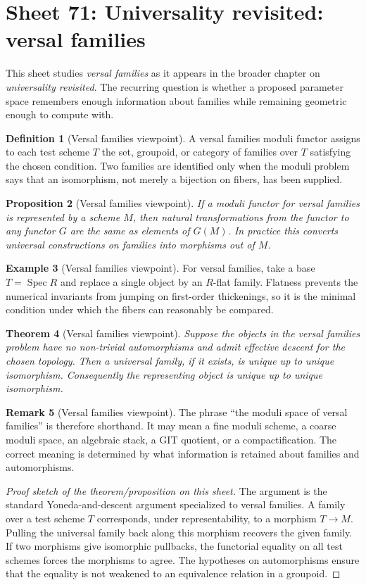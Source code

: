 \documentclass[11pt]{amsart}
\newtheorem{theorem}{Theorem}[section]
\newtheorem{proposition}[theorem]{Proposition}
\theoremstyle{definition}
\newtheorem{definition}[theorem]{Definition}
\newtheorem{example}[theorem]{Example}
\newtheorem{remark}[theorem]{Remark}
\newcommand{\Spec}{\operatorname{Spec}}
\begin{document}
\section{Sheet 71: Universality revisited: versal families}
This sheet studies \emph{versal families} as it appears in the broader chapter on \emph{universality revisited}.  The recurring question is whether a proposed parameter space remembers enough information about families while remaining geometric enough to compute with.
\begin{definition}[Versal families viewpoint]
A versal families moduli functor assigns to each test scheme $T$ the set, groupoid, or category of families over $T$ satisfying the chosen condition.  Two families are identified only when the moduli problem says that an isomorphism, not merely a bijection on fibers, has been supplied.
\end{definition}
\begin{proposition}[Versal families viewpoint]
If a moduli functor for versal families is represented by a scheme $M$, then natural transformations from the functor to any functor $G$ are the same as elements of $G(M)$.  In practice this converts universal constructions on families into morphisms out of $M$.
\end{proposition}
\begin{example}[Versal families viewpoint]
For versal families, take a base $T=\Spec R$ and replace a single object by an $R$-flat family.  Flatness prevents the numerical invariants from jumping on first-order thickenings, so it is the minimal condition under which the fibers can reasonably be compared.
\end{example}
\begin{theorem}[Versal families viewpoint]
Suppose the objects in the versal families problem have no non-trivial automorphisms and admit effective descent for the chosen topology.  Then a universal family, if it exists, is unique up to unique isomorphism.  Consequently the representing object is unique up to unique isomorphism.
\end{theorem}
\begin{remark}[Versal families viewpoint]
The phrase ``the moduli space of versal families'' is therefore shorthand.  It may mean a fine moduli scheme, a coarse moduli space, an algebraic stack, a GIT quotient, or a compactification.  The correct meaning is determined by what information is retained about families and automorphisms.
\end{remark}
\begin{proof}[Proof sketch of the theorem/proposition on this sheet]
The argument is the standard Yoneda-and-descent argument specialized to versal families.  A family over a test scheme $T$ corresponds, under representability, to a morphism $T\to M$.  Pulling the universal family back along this morphism recovers the given family.  If two morphisms give isomorphic pullbacks, the functorial equality on all test schemes forces the morphisms to agree.  The hypotheses on automorphisms ensure that the equality is not weakened to an equivalence relation in a groupoid.
\end{proof}
\end{document}
